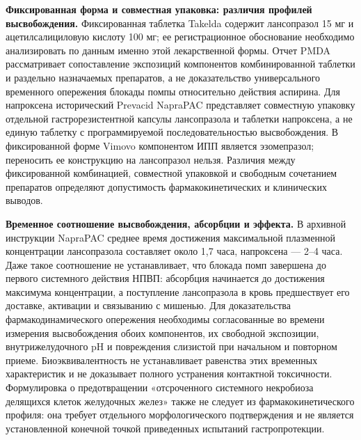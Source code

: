 \documentclass[11pt,a4paper,notitlepage]{report}
\newcommand{\src}[1]{\unskip\space\cite{#1}}
\begin{document}
\textbf{Фиксированная форма и совместная упаковка: различия профилей высвобождения.} Фиксированная таблетка Takelda содержит лансопразол 15 мг и ацетилсалициловую кислоту 100 мг; ее регистрационное обоснование необходимо анализировать по данным именно этой лекарственной формы. Отчет PMDA рассматривает сопоставление экспозиций компонентов комбинированной таблетки и раздельно назначаемых препаратов, а не доказательство универсального временного опережения блокады помпы относительно действия аспирина.\src{fdctakeldareview,fdctakeldalabel} Для напроксена исторический Prevacid NapraPAC представляет совместную упаковку отдельной гастрорезистентной капсулы лансопразола и таблетки напроксена, а не единую таблетку с программируемой последовательностью высвобождения. В фиксированной форме Vimovo компонентом ИПП является эзомепразол; переносить ее конструкцию на лансопразол нельзя. Различия между фиксированной комбинацией, совместной упаковкой и свободным сочетанием препаратов определяют допустимость фармакокинетических и клинических выводов.\src{fdcnaprapac,fdcvimovo}

\textbf{Временное соотношение высвобождения, абсорбции и эффекта.} В архивной инструкции NapraPAC среднее время достижения максимальной плазменной концентрации лансопразола составляет около 1,7 часа, напроксена --- 2--4 часа. Даже такое соотношение не устанавливает, что блокада помп завершена до первого системного действия НПВП: абсорбция начинается до достижения максимума концентрации, а поступление лансопразола в кровь предшествует его доставке, активации и связыванию с мишенью.\src{fdcnaprapac} Для доказательства фармакодинамического опережения необходимы согласованные во времени измерения высвобождения обоих компонентов, их свободной экспозиции, внутрижелудочного pH и повреждения слизистой при начальном и повторном приеме. Биоэквивалентность не устанавливает равенства этих временных характеристик и не доказывает полного устранения контактной токсичности.\src{fdctakeldareview,phthoring1999} Формулировка о предотвращении «отсроченного системного некробиоза делящихся клеток желудочных желез» также не следует из фармакокинетического профиля: она требует отдельного морфологического подтверждения и не является установленной конечной точкой приведенных испытаний гастропротекции.\src{misotrial,aspirin15,nsaid15}
\end{document}
